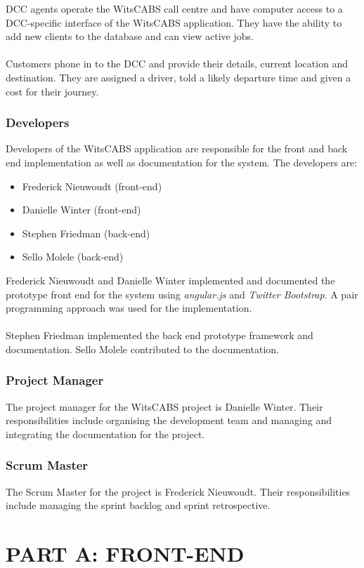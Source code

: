 \documentclass[12pt]{article}
\begin{document}
DCC agents operate the WitsCABS call centre and have computer access to a DCC-specific interface of the WitsCABS application. They have the ability to add new clients to the database and can view active jobs. \\\\

Customers phone in to the DCC and provide their details, current location and destination. They are assigned a driver, told a likely departure time and given a cost for their journey.

\subsubsection{Developers}
Developers of the WitsCABS application are responsible for the front and back end implementation as well as documentation for the system. The developers are:
\begin{itemize}
\item Frederick Nieuwoudt (front-end)
\item Danielle Winter (front-end)
\item Stephen Friedman (back-end)
\item Sello Molele (back-end)
\end{itemize} 
Frederick Nieuwoudt and Danielle Winter implemented and documented the prototype front end for the system using \textit{angular.js} and \textit{Twitter Bootstrap}. A pair programming approach was used for the implementation.\\\\
Stephen Friedman implemented the back end prototype framework and documentation. Sello Molele contributed to the documentation.
\subsubsection{Project Manager}
The project manager for the WitsCABS project is Danielle Winter. Their responsibilities include organising the development team and managing and integrating the documentation for the project. 
\subsubsection{Scrum Master}
The Scrum Master for the project is Frederick Nieuwoudt. Their responsibilities include managing the sprint backlog and sprint retrospective.   

\newpage
\section{PART A: FRONT-END}
\end{document}
